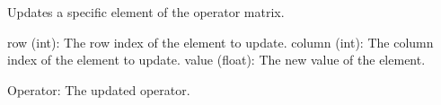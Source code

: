 \documentclass[letterpaper,10pt,english]{sphinxmanual}
\begin{document}
\begin{fulllineitems}
\begin{fulllineitems}
\label{\detokenize{index:utils.tensor.Operator.update}}
\pysigstartsignatures
{}
\pysigstopsignatures
\sphinxAtStartPar
Updates a specific element of the operator matrix.
\begin{description}
\sphinxAtStartPar
row (int): The row index of the element to update.
column (int): The column index of the element to update.
value (float): The new value of the element.

\sphinxAtStartPar
Operator: The updated operator.

\end{description}

\end{fulllineitems}


\end{fulllineitems}

\end{document}
